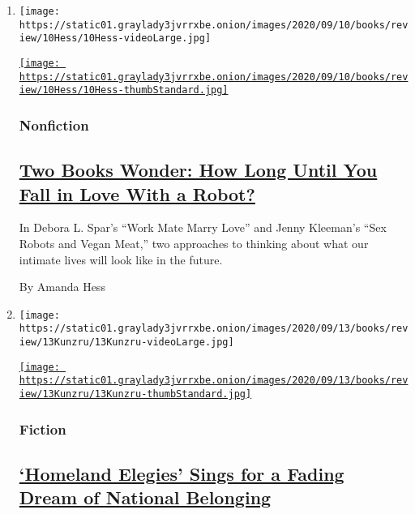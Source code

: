\begin{enumerate}
\def\labelenumi{\arabic{enumi}.}
\item
  \texttt{[image: https://static01.graylady3jvrrxbe.onion/images/2020/09/10/books/review/10Hess/10Hess-videoLarge.jpg]}

  \href{/2020/09/11/books/review/work-mate-marry-love-debora-spar-sex-robots-and-vegan-meat-jenny-kleeman.html}{\texttt{[image: https://static01.graylady3jvrrxbe.onion/images/2020/09/10/books/review/10Hess/10Hess-thumbStandard.jpg]}}

  \hypertarget{nonfiction}{%
  \subsubsection{Nonfiction}\label{nonfiction}}

  \hypertarget{two-books-wonder-how-long-until-you-fall-in-love-with-a-robot}{%
  \subsection{\texorpdfstring{\href{/2020/09/11/books/review/work-mate-marry-love-debora-spar-sex-robots-and-vegan-meat-jenny-kleeman.html}{Two
  Books Wonder: How Long Until You Fall in Love With a
  Robot?}}{Two Books Wonder: How Long Until You Fall in Love With a Robot?}}\label{two-books-wonder-how-long-until-you-fall-in-love-with-a-robot}}

  In Debora L. Spar's ``Work Mate Marry Love'' and Jenny Kleeman's ``Sex
  Robots and Vegan Meat,'' two approaches to thinking about what our
  intimate lives will look like in the future.

  By Amanda Hess
\item
  \texttt{[image: https://static01.graylady3jvrrxbe.onion/images/2020/09/13/books/review/13Kunzru/13Kunzru-videoLarge.jpg]}

  \href{/2020/09/10/books/review/ayad-akhtar-homeland-elegies.html}{\texttt{[image: https://static01.graylady3jvrrxbe.onion/images/2020/09/13/books/review/13Kunzru/13Kunzru-thumbStandard.jpg]}}

  \hypertarget{fiction}{%
  \subsubsection{Fiction}\label{fiction}}

  \hypertarget{homeland-elegies-sings-for-a-fading-dream-of-national-belonging}{%
  \subsection{\texorpdfstring{\href{/2020/09/10/books/review/ayad-akhtar-homeland-elegies.html}{`Homeland
  Elegies' Sings for a Fading Dream of National
  Belonging}}{`Homeland Elegies' Sings for a Fading Dream of National Belonging}}\label{homeland-elegies-sings-for-a-fading-dream-of-national-belonging}}


\end{enumerate}
